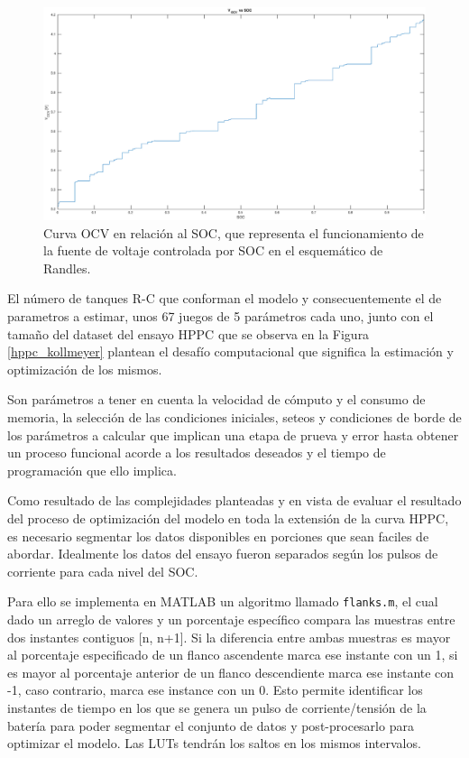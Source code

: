 \documentclass[10pt, a4paper]{article}
\newcounter{subsubsubsection}[subsubsection]
\begin{document}
\begin{figure}[h!]
    \begin{center}
        \includegraphics[width=.7\textwidth]{ocv_vs_soc.eps}
        \caption{Curva \acrshort{OCV} en relaci\'on al \acrshort{SOC}, que
            representa el funcionamiento de la fuente de voltaje controlada por
        \acrshort{SOC} en el esquem\'atico de Randles.}
    \end{center}
    \label{fig:ocv_vs_soc}
\end{figure}
\FloatBarrier

\label{flank_seg}

El número de tanques R-C que conforman el modelo y consecuentemente el de
parametros a estimar, unos 67 juegos de 5 parámetros cada uno, junto con el
tamaño del dataset del ensayo \acrshort{HPPC} que se observa en la Figura
\ref{hppc_kollmeyer} plantean el desafío computacional que significa la
estimación y optimización de los mismos. 

Son parámetros a tener en cuenta la velocidad de cómputo y el consumo de
memoria, la selección de las condiciones iniciales, seteos y condiciones de
borde de los parámetros a calcular que implican una etapa de
prueva y error hasta obtener un proceso funcional acorde a los resultados
deseados y el tiempo de programación que ello implica.

Como resultado de las complejidades planteadas y en vista de evaluar el resultado
del proceso de optimizaci\'on del modelo en toda la extensión de la curva
\acrshort{HPPC}, es necesario segmentar los datos disponibles en porciones que
sean faciles de abordar. Idealmente los datos del ensayo fueron separados según
los pulsos de corriente para cada nivel del \acrshort{SOC}. 

Para ello se implementa en MATLAB un algoritmo llamado \texttt{flanks.m}, el cual
dado un arreglo de valores y un porcentaje espec\'ifico compara las muestras
entre dos instantes contiguos [n, n+1]. Si la diferencia entre ambas muestras es
mayor al porcentaje especificado de un flanco ascendente marca ese instante con
un 1, si es mayor al porcentaje anterior de un flanco descendiente marca ese
instante con -1, caso contrario, marca ese instance con un 0. Esto permite
identificar los instantes de tiempo en los que se genera un pulso de
corriente/tensi\'on de la bater\'ia para poder segmentar el conjunto de datos y
post-procesarlo para optimizar el modelo. Las \acrshort{LUT}s tendrán los saltos
en los mismos intervalos.
\end{document}
